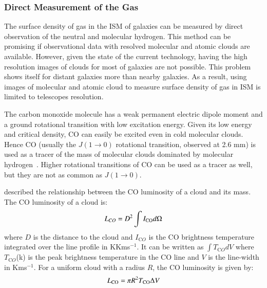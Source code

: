 \subsubsection{Direct Measurement of the Gas}

The surface density of gas in the ISM of galaxies can be measured by direct observation of the neutral and molecular hydrogen.
This method can be promising if observational data with resolved molecular and atomic clouds are available.
However, given the state of the current technology, having the high resolution images of clouds for most of galaxies are not possible. 
This problem shows itself for distant galaxies more than nearby galaxies. 
As a result, using images of molecular and atomic cloud to measure surface density of gas in ISM is limited to telescopes resolution. 
 
The carbon monoxide molecule has a weak permanent electric dipole moment and a ground rotational transition with low excitation energy. 
Given its low energy and critical density, CO can easily be excited even in cold molecular clouds.
Hence CO (usually the $J(1\rightarrow 0)$ rotational transition, observed at 2.6 mm) is used as a tracer of the mass of molecular clouds dominated by molecular hydrogen~\citep[e.g.][] {Sanders84}.
Higher rotational transitions of CO can be used as a tracer as well, but they are not as common as $J(1\rightarrow 0)$.

\cite{Young91} described the relationship between the CO luminosity of a cloud and its mass. The CO luminosity of a cloud is:
\begin{equation}
L_{CO} = D^2 \int I_{\rm CO} d\Omega 
\end{equation}
where $D$ is the distance to the cloud and 
$I_{\mathrm CO}$ is the CO brightness temperature integrated over the line profile in KKms$^{-1}$.
It can be written as ${\int T_{\mathrm CO} dV}$ where $T_{\mathrm CO}$(k) is the peak brightness temperature in the CO line and $V$ is the line-width in Kms$^{-1}$.
For a uniform cloud with a radius $R$, the CO luminosity is given by:
 \begin{equation}
L_{\rm CO} = \pi R^2 T_{\rm CO} \Delta V
\end{equation}

